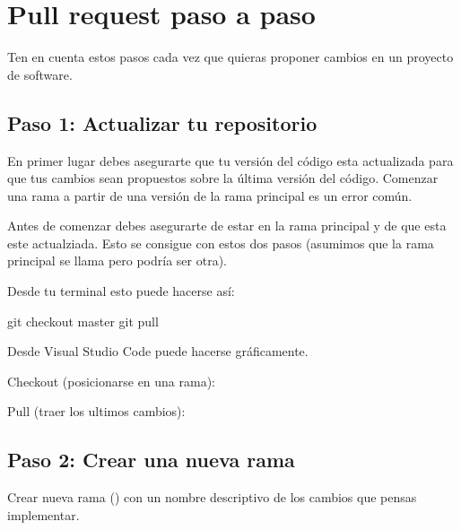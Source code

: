 \documentclass[a5paper,9pt,spanish]{sphinxmanual}
\begin{document}
\section{Pull request paso a paso}
\label{\detokenize{mi-primer-pr:pull-request-paso-a-paso}}
\sphinxAtStartPar
Ten en cuenta estos pasos cada vez que quieras proponer cambios en un proyecto de
software.


\subsection{Paso 1: Actualizar tu repositorio}
\label{\detokenize{mi-primer-pr:paso-1-actualizar-tu-repositorio}}
\sphinxAtStartPar
En primer lugar debes asegurarte que tu versión del código esta actualizada para
que tus cambios sean propuestos sobre la última versión del código.
Comenzar una rama a partir de una versión  de la rama principal es un error
común.

\sphinxAtStartPar
Antes de comenzar debes asegurarte de estar en la rama principal y de que esta este
actualziada. Esto se consigue con estos dos pasos (asumimos que la rama principal se
llama  pero podría ser otra).

\sphinxAtStartPar
Desde tu terminal esto puede hacerse así:

\begin{sphinxVerbatim}[commandchars=\\\{\}]
git checkout master
git pull
\end{sphinxVerbatim}

\sphinxAtStartPar
Desde Visual Studio Code puede hacerse gráficamente.

\sphinxAtStartPar
Checkout (posicionarse en una rama):

\noindent{}

\sphinxAtStartPar
Pull (traer los ultimos cambios):

\noindent{}


\subsection{Paso 2: Crear una nueva rama}
\label{\detokenize{mi-primer-pr:paso-2-crear-una-nueva-rama}}
\sphinxAtStartPar
Crear nueva rama () con un nombre descriptivo
de los cambios que pensas implementar.
\end{document}
